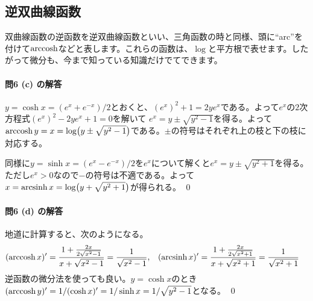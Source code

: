 \subsection{逆双曲線函数}

双曲線函数の逆函数を逆双曲線函数といい、三角函数の時と同様、頭に``arc''を付けて$\operatorname{arccosh}$などと表します。これらの函数は、$\log$と平方根で表せます。したがって微分も、今まで知っている知識だけでてできます。

\paragraph{問6 (c) の解答}

$y=\cosh x = (e^x+e^{-x})/2$とおくと、$(e^x)^2 + 1 = 2ye^x$である。よって$e^x$の$2$次方程式$(e^x)^2 - 2y e^x+1=0$を解いて
$e^x = y\pm\sqrt{y^2-1}$を得る。よって$\operatorname{arccosh} y = x = \log\bigl(y\pm\sqrt{y^2-1}\bigr)$である。$\pm$の符号はそれぞれ上の枝と下の枝に対応する。

同様に$y=\sinh x = (e^x - e^{-x})/2$を$e^x$について解くと$e^x=y\pm\sqrt{y^2+1}$を得る。ただし$e^x>0$なので$-$の符号は不適である。よって$x=\operatorname{arcsinh} x=\log\bigl(y+\sqrt{y^2+1}\bigr)$が得られる。 \qed

\paragraph{問6 (d) の解答} 地道に計算すると、次のようになる。
\begin{align*}
(\operatorname{arccosh} x)' &= \frac{1+\frac{2x}{2\sqrt{x^2-1}}}{x+\sqrt{x^2-1}} = \frac{1}{\sqrt{x^2-1}}, &
(\operatorname{arcsinh} x)' &= \frac{1+\frac{2x}{2\sqrt{x^2+1}}}{x+\sqrt{x^2+1}} = \frac{1}{\sqrt{x^2+1}}
\end{align*}
逆函数の微分法を使っても良い。$y=\cosh x$のとき$(\operatorname{arccosh} y)' = 1 / (\cosh x)' = 1 / \sinh x = 1 / \sqrt{y^2-1}$となる。 \qed


